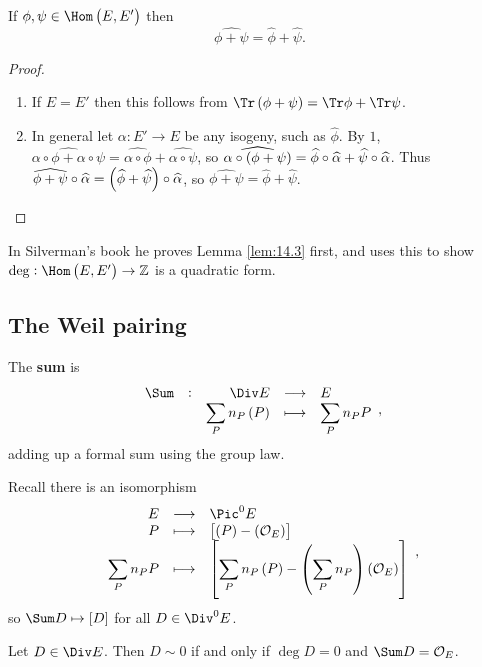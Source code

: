 \begin{lemma}
\label{lem:14.3}
If $ \phi, \psi \in \Hom\br{E, E'} $ then
$$ \widehat{\phi + \psi} = \widehat{\phi} + \widehat{\psi}. $$
\end{lemma}

\begin{proof}
\hfill
\begin{enumerate}
\item If $ E = E' $ then this follows from $ \Tr \br{\phi + \psi} = \Tr \phi + \Tr \psi $.
\item In general let $ \alpha : E' \to E $ be any isogeny, such as $ \widehat{\phi} $. By $ 1 $, $ \widehat{\alpha \circ \phi + \alpha \circ \psi} = \widehat{\alpha \circ \phi} + \widehat{\alpha \circ \psi} $, so $ \widehat{\alpha \circ \br{\phi + \psi}} = \widehat{\phi} \circ \widehat{\alpha} + \widehat{\psi} \circ \widehat{\alpha} $. Thus $ \widehat{\phi + \psi} \circ \widehat{\alpha} = \br{\widehat{\phi} + \widehat{\psi}} \circ \widehat{\alpha} $, so $ \widehat{\phi + \psi} = \widehat{\phi} + \widehat{\psi} $.
\end{enumerate}
\end{proof}

\begin{remark*}
In Silverman's book he proves Lemma \ref{lem:14.3} first, and uses this to show $ \deg : \Hom\br{E, E'} \to \ZZ $ is a quadratic form.
\end{remark*}

\pagebreak

\subsection{The Weil pairing}


\begin{definition*}
The \textbf{sum} is
$$ \function[\Sum]{\Div E}{E}{\sum_P n_P\br{P}}{\sum_P n_PP}, $$
adding up a formal sum using the group law.
\end{definition*}

Recall there is an isomorphism
$$ \functions{E}{\Pic^0 E}{P}{\sbr{\br{P} - \br{\OOO_E}}}{\sum_P n_PP}{\sbr{\sum_P n_P\br{P} - \br{\sum_P n_P}\br{\OOO_E}}}, $$
so $ \Sum D \mapsto \sbr{D} $ for all $ D \in \Div^0 E $.

\begin{lemma}
Let $ D \in \Div E $. Then $ D \sim 0 $ if and only if $ \deg D = 0 $ and $ \Sum D = \OOO_E $.
\end{lemma}


